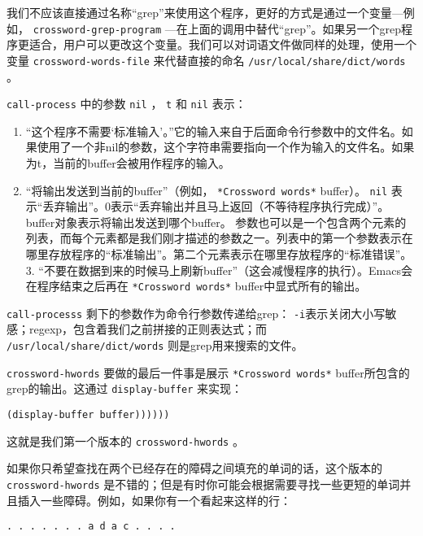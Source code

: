 我们不应该直接通过名称“grep”来使用这个程序，更好的方式是通过一个变量---例如， \texttt{crossword-grep-program} ---在上面的调用中替代“grep”。如果另一个grep程序更适合，用户可以更改这个变量。我们可以对词语文件做同样的处理，使用一个变量 \texttt{crossword-words-file} 来代替直接的命名 \verb|/usr/local/share/dict/words| 。

 \texttt{call-process} 中的参数 \texttt{nil} ， \texttt{t} 和 \texttt{nil} 表示：

\begin{enumerate}
  \item “这个程序不需要‘标准输入’。”它的输入来自于后面命令行参数中的文件名。如果使用了一个非nil的参数，这个字符串需要指向一个作为输入的文件名。如果为t，当前的buffer会被用作程序的输入。
  \item “将输出发送到当前的buffer”（例如， \texttt{*Crossword words*} buffer）。 \texttt{nil} 表示“丢弃输出”。0表示“丢弃输出并且马上返回（不等待程序执行完成）”。buffer对象表示将输出发送到哪个buffer。
 参数也可以是一个包含两个元素的列表，而每个元素都是我们刚才描述的参数之一。列表中的第一个参数表示在哪里存放程序的“标准输出”。第二个元素表示在哪里存放程序的“标准错误”。
3. “不要在数据到来的时候马上刷新buffer”（这会减慢程序的执行）。Emacs会在程序结束之后再在 \texttt{*Crossword words*} buffer中显式所有的输出。
\end{enumerate}

 \texttt{call-processs} 剩下的参数作为命令行参数传递给grep： \texttt{-i}表示关闭大小写敏感；regexp，包含着我们之前拼接的正则表达式；而 \verb|/usr/local/share/dict/words| 则是grep用来搜索的文件。

 \texttt{crossword-hwords} 要做的最后一件事是展示 \texttt{*Crossword words*} buffer所包含的grep的输出。这通过 \texttt{display-buffer} 来实现：

\begin{verbatim}
(display-buffer buffer))))))
\end{verbatim}

这就是我们第一个版本的 \texttt{crossword-hwords} 。

如果你只希望查找在两个已经存在的障碍之间填充的单词的话，这个版本的 \texttt{crossword-hwords} 是不错的；但是有时你可能会根据需要寻找一些更短的单词并且插入一些障碍。例如，如果你有一个看起来这样的行：

\begin{verbatim}
. . . . . . . a d a c . . . . 
\end{verbatim}

